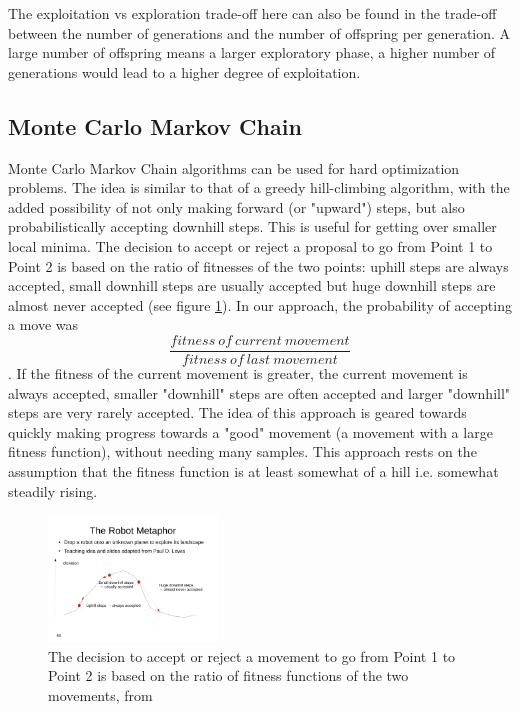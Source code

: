The exploitation vs exploration trade-off here can also be found in the trade-off between the number of generations and the number of offspring per generation. A large number of offspring means a larger exploratory phase, a higher number of generations would lead to a higher degree of exploitation.

\subsection{Monte Carlo Markov Chain} \label{sec:MCMC}

Monte Carlo Markov Chain algorithms can be used for hard optimization problems. The idea is similar to that of a greedy hill-climbing algorithm, with the added possibility of not only making forward (or "upward") steps, but also probabilistically accepting downhill steps. This is useful for getting over smaller local minima. The decision to accept or reject a proposal to go from Point 1 to Point 2 is based on the ratio of fitnesses of the two points: uphill steps are always accepted, small downhill steps are usually accepted but huge downhill steps are almost never accepted (see figure \ref{fig:MCMC2}). In our approach, the probability of accepting a move was $$\frac{fitness\ of\ current\ movement}{fitness\ of\ last\ movement}$$. If the fitness of the current movement is greater, the current movement is always accepted, smaller "downhill" steps are often accepted and larger "downhill" steps are very rarely accepted. The idea of this approach is geared towards quickly making progress towards a "good" movement (a movement with a large fitness function), without needing many samples. This approach rests on the assumption that the fitness function is at least somewhat of a hill i.e. somewhat steadily rising.

\begin{figure}
	\begin{center}
		\includegraphics[trim = 0cm 4cm 1cm 7cm, clip, width=0.4\textwidth]{lecture12-seiten-48}
	\end{center}
	\caption{The decision to accept or reject a movement to go from Point 1 to Point 2 is based on the ratio of fitness functions of the two movements, from \cite{MCMC}}
	\label{fig:MCMC2}
\end{figure}
